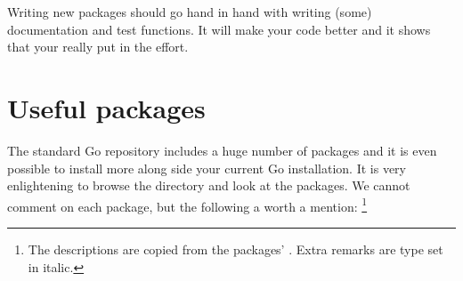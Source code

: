\begin{lbar}
Writing new packages should go hand in hand with writing (some)
documentation and test functions. It will make your code better and it
shows that your really put in the effort.
\end{lbar}

\section{Useful packages}
The standard Go repository includes a huge number of packages and it is
even possible to install more along side your current Go installation. 
It is very enlightening to browse the  directory and
look at the packages.
We cannot comment on each package, but the following a worth a mention:
\footnote{The descriptions are copied from the packages' . Extra
remarks are type set in italic.}

